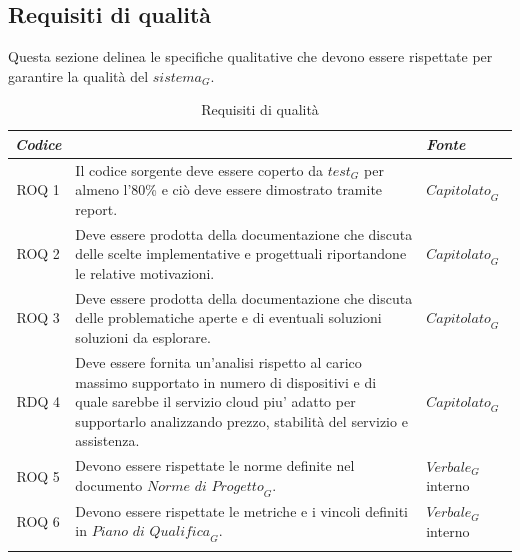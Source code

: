 \documentclass[12pt, oneside]{article}
\begin{document}
\subsection{Requisiti di qualità}
Questa sezione delinea le specifiche qualitative che devono essere rispettate per garantire la qualità del $\textit{sistema}_G$.
\begin{longtable}{|c|p{14cm}|p{2cm}|}
    \hline
    \emph{Codice} & \centering{\emph{Descrizione}} &  \emph{Fonte} \\
    \hline
    \endfirsthead
    \endhead
    ROQ 1&  Il codice sorgente deve essere coperto da $\textit{test}_G$ per almeno l'80\% e ciò deve essere dimostrato tramite report. & $\textit{Capitolato}_G$ \\
    \hline
    ROQ 2 & Deve essere prodotta della documentazione che discuta delle scelte implementative e progettuali riportandone le relative motivazioni. & $\textit{Capitolato}_G$ \\
    \hline
    ROQ 3 & Deve essere prodotta della documentazione che discuta delle problematiche aperte e di eventuali soluzioni soluzioni da esplorare. & $\textit{Capitolato}_G$ \\
    \hline
    RDQ 4 & Deve essere fornita un'analisi rispetto al carico massimo supportato in numero di dispositivi e di quale sarebbe il servizio cloud piu' adatto per supportarlo analizzando prezzo, stabilità del servizio e assistenza. & $\textit{Capitolato}_G$ \\
    \hline
    ROQ 5 & Devono essere rispettate le norme definite nel documento $\textit{Norme di Progetto}_G$. & $\textit{Verbale}_G$ interno \\
    \hline
    ROQ 6 & Devono essere rispettate le metriche e i vincoli definiti in $\textit{Piano di Qualifica}_G$. & $\textit{Verbale}_G$ interno \\
    \hline
\caption{Requisiti di qualità}
\end{longtable}
    
\end{document}
